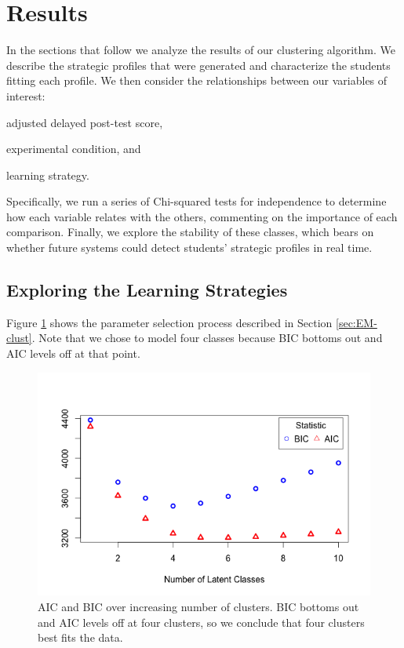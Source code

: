 \documentclass{edm_template}
\begin{document}
\section{Results}
\label{sec:results}

In the sections that follow we analyze the results of our clustering algorithm. We describe the strategic profiles that were generated and characterize the students fitting each profile. We then consider the relationships between our variables of interest: 
\begin{inparaenum}[\itshape (a)]
\item adjusted delayed post-test score,
\item experimental condition, and
\item learning strategy.
\end{inparaenum}
Specifically, we run a series of Chi-squared tests for independence to determine how each variable relates with the others, commenting on the importance of each comparison. Finally, we explore the stability of these classes, which bears on whether future systems could detect students' strategic profiles in real time.

\subsection{Exploring the Learning Strategies}
\label{sec:exploring-classes}

Figure \ref{fig:LCa-test-statistics} shows the parameter selection process described in Section \ref{sec:EM-clust}. Note that we chose to model four classes because BIC bottoms out and AIC levels off at that point.

\begin{figure}[htbp]
\includegraphics[scale=0.4]{LCa-stats-plot.png}
\caption{AIC and BIC over increasing number of clusters. BIC bottoms out and AIC levels off at four clusters, so we conclude that four clusters best fits the data.}
\label{fig:LCa-test-statistics}
\end{figure}
\end{document}
